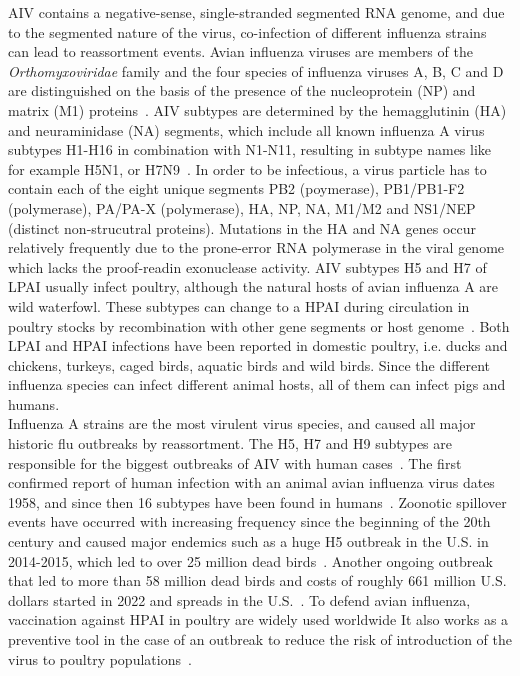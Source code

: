 AIV contains a negative-sense, single-stranded segmented RNA genome, and due to the segmented nature of the virus, co-infection of different influenza strains can lead to reassortment events. Avian influenza viruses are members of the \textit{Orthomyxoviridae} family and the four species of influenza viruses A, B, C and D are distinguished on the basis of the presence of the nucleoprotein (NP) and matrix (M1) proteins~\cite{webster1992evolution}. AIV subtypes are determined by the hemagglutinin (HA) and neuraminidase (NA) segments, which include all known influenza A virus subtypes H1-H16 in combination with N1-N11, resulting in subtype names like for example H5N1, or H7N9~\cite{webster1992evolution, krammer2018influenza}. In order to be infectious, a virus particle has to contain each of the eight unique segments PB2 (poymerase), PB1/PB1-F2 (polymerase), PA/PA-X (polymerase), HA, NP, NA, M1/M2 and NS1/NEP (distinct non-strucutral proteins). Mutations in the HA and NA genes occur relatively frequently due to the prone-error RNA polymerase in the viral genome which lacks the proof-readin exonuclease activity. AIV subtypes H5 and H7 of LPAI usually infect poultry, although the natural hosts of avian influenza A are wild waterfowl. These subtypes can change to a HPAI during circulation in poultry stocks by recombination with other gene segments or host genome~\cite{webster2006h5n1}. Both LPAI and HPAI infections have been reported in domestic poultry, i.e. ducks and chickens, turkeys, caged birds, aquatic birds and wild birds. Since the different influenza species can infect different animal hosts, all of them can infect pigs and humans. \\
Influenza A strains are the most virulent virus species, and caused all major historic flu outbreaks by reassortment. The H5, H7 and H9 subtypes are responsible for the biggest outbreaks of AIV with human cases~\cite{widdowson2017global}. The first confirmed report of human infection with an animal avian influenza virus dates 1958, and since then 16 subtypes have been found in humans~\cite{kluska1961demonstration}. Zoonotic spillover events have occurred with increasing frequency since the beginning of the 20th century and caused major endemics such as a huge H5 outbreak in the U.S. in 2014-2015, which led to over 25 million dead birds~\cite{seeger2021poultry}. Another ongoing outbreak that led to more than 58 million dead birds and costs of roughly 661 million U.S. dollars started in 2022 and spreads in the U.S.~\cite{usda2023hpai}. 
To defend avian influenza, vaccination against HPAI in poultry are widely used worldwide It also works as a preventive tool in the case of an outbreak to reduce the risk of introduction of the virus to poultry populations~\cite{swayne2013current, swayne2011assessment}. 

